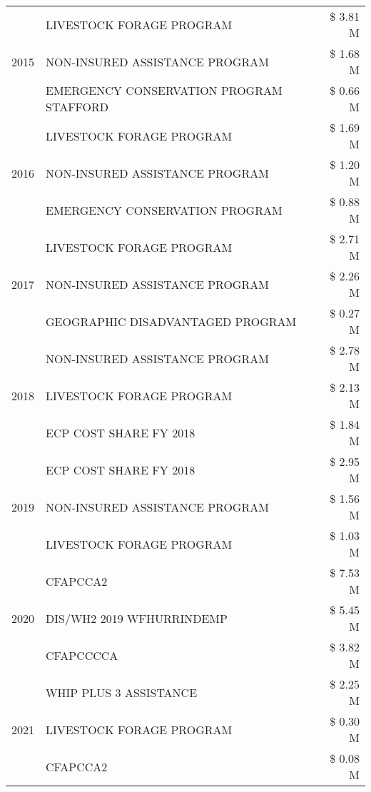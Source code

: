\begin{tabular}{llr}
\cline{1-3}
\multirow[t]{3}{*}{2015} & LIVESTOCK FORAGE PROGRAM & \$ 3.81 M \\
 & NON-INSURED ASSISTANCE PROGRAM & \$ 1.68 M \\
 & EMERGENCY CONSERVATION PROGRAM STAFFORD & \$ 0.66 M \\
\cline{1-3}
\multirow[t]{3}{*}{2016} & LIVESTOCK FORAGE PROGRAM                      & \$ 1.69 M \\
 & NON-INSURED ASSISTANCE PROGRAM                & \$ 1.20 M \\
 & EMERGENCY CONSERVATION PROGRAM                & \$ 0.88 M \\
\cline{1-3}
\multirow[t]{3}{*}{2017} & LIVESTOCK FORAGE PROGRAM & \$ 2.71 M \\
 & NON-INSURED ASSISTANCE PROGRAM & \$ 2.26 M \\
 & GEOGRAPHIC DISADVANTAGED PROGRAM & \$ 0.27 M \\
\cline{1-3}
\multirow[t]{3}{*}{2018} & NON-INSURED ASSISTANCE PROGRAM & \$ 2.78 M \\
 & LIVESTOCK FORAGE PROGRAM & \$ 2.13 M \\
 & ECP COST SHARE FY 2018 & \$ 1.84 M \\
\cline{1-3}
\multirow[t]{3}{*}{2019} & ECP COST SHARE FY 2018 & \$ 2.95 M \\
 & NON-INSURED ASSISTANCE PROGRAM & \$ 1.56 M \\
 & LIVESTOCK FORAGE PROGRAM & \$ 1.03 M \\
\cline{1-3}
\multirow[t]{3}{*}{2020} & CFAPCCA2 & \$ 7.53 M \\
 & DIS/WH2 2019 WFHURRINDEMP & \$ 5.45 M \\
 & CFAPCCCCA & \$ 3.82 M \\
\cline{1-3}
\multirow[t]{3}{*}{2021} & WHIP PLUS 3 ASSISTANCE & \$ 2.25 M \\
 & LIVESTOCK FORAGE PROGRAM & \$ 0.30 M \\
 & CFAPCCA2 & \$ 0.08 M \\
\cline{1-3}
\bottomrule
\end{tabular}
